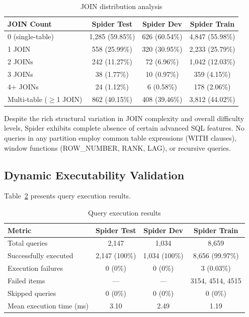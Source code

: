 \documentclass[]{einformatica}
\begin{document}
\begin{table}[ht]
    \caption{JOIN distribution analysis}
    \label{tab:joins}
    \centering
    \footnotesize
    \begin{tabular}{lccc}
        \toprule
        \textbf{JOIN Count} & \textbf{Spider Test} & \textbf{Spider Dev} & \textbf{Spider Train} \\
        \midrule
        0 (single-table) & 1,285 (59.85\%) & 626 (60.54\%) & 4,847 (55.98\%) \\
        1 JOIN & 558 (25.99\%) & 320 (30.95\%) & 2,233 (25.79\%) \\
        2 JOINs & 242 (11.27\%) & 72 (6.96\%) & 1,042 (12.03\%) \\
        3 JOINs & 38 (1.77\%) & 10 (0.97\%) & 359 (4.15\%) \\
        4+ JOINs & 24 (1.12\%) & 6 (0.58\%) & 178 (2.06\%) \\
        Multi-table ($\ge$1 JOIN) & 862 (40.15\%) & 408 (39.46\%) & 3,812 (44.02\%) \\
        \bottomrule
    \end{tabular}
\end{table}

Despite the rich structural variation in JOIN complexity and overall difficulty levels, Spider exhibits complete absence of certain advanced SQL features. No queries in any partition employ common table expressions (WITH clauses), window functions (ROW\_NUMBER, RANK, LAG), or recursive queries.

\subsection{Dynamic Executability Validation}\label{sec:execution_results}

Table~\ref{tab:execution} presents query execution results.

\begin{table}[ht]
    \caption{Query execution results}
    \label{tab:execution}
    \centering
    \footnotesize
    \begin{tabular}{lccc}
        \toprule
        \textbf{Metric} & \textbf{Spider Test} & \textbf{Spider Dev} & \textbf{Spider Train} \\
        \midrule
        Total queries & 2,147 & 1,034 & 8,659 \\
        Successfully executed & 2,147 (100\%) & 1,034 (100\%) & 8,656 (99.97\%) \\
        Execution failures & 0 (0\%) & 0 (0\%) & 3 (0.03\%) \\
        Failed items & --- & --- & 3154, 4514, 4515 \\
        Skipped queries & 0 (0\%) & 0 (0\%) & 0 (0\%) \\
        Mean execution time (ms) & 3.10 & 2.49 & 1.19 \\
        \bottomrule
    \end{tabular}
\end{table}
\end{document}
